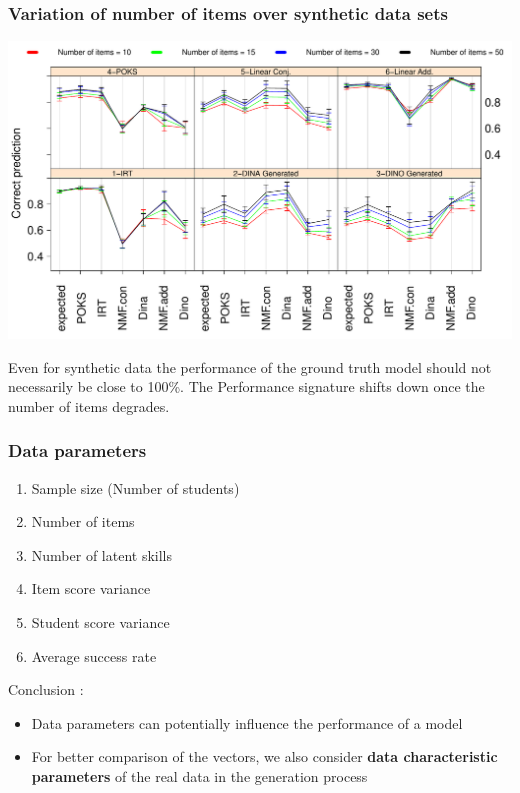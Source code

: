 \documentclass{beamer}
\begin{document}
\begin{frame}\frametitle{Variation of number of items over synthetic data sets}
\includegraphics[scale =0.37] {images/numberofitems}
\begin{overprint}
	   Even for synthetic data the performance of the ground truth model should not necessarily be close to 100\%.
       The Performance signature shifts down once the number of items degrades.
\end{overprint}
\end{frame}

\begin{frame}\frametitle{Data parameters}
\begin{enumerate}
\item Sample size (Number of students)
\item Number of items
\item Number of latent skills
\item Item score variance 
\item Student score variance
\item Average success rate\pause
\end{enumerate}
Conclusion :
\begin{itemize}
      \item Data parameters can potentially influence the performance of a model%
	  \item For better comparison of the vectors, we also consider \textbf{data characteristic parameters} of the real data in the generation process%
\end{itemize}
\end{frame}
\end{document}
